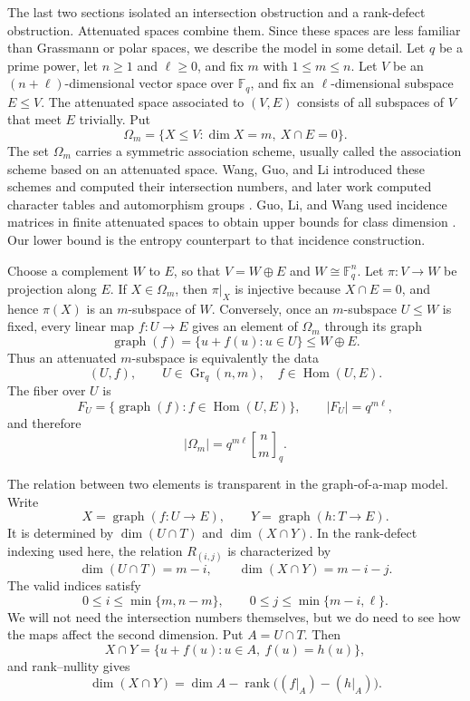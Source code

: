 \documentclass[11pt]{article}
\theoremstyle{definition}
\theoremstyle{remark}
\newcommand{\F}{\mathbb F}
\newcommand{\Gr}{\operatorname{Gr}}
\newcommand{\Hom}{\operatorname{Hom}}
\newcommand{\rank}{\operatorname{rank}}
\newcommand{\qbinom}[2]{\genfrac{[}{]}{0pt}{}{#1}{#2}_q}
\begin{document}
The last two sections isolated an intersection obstruction and a rank-defect
obstruction.  Attenuated spaces combine them.  Since these spaces are less
familiar than Grassmann or polar spaces, we describe the model in some detail.
Let \(q\) be a prime power, let
\(n\geq1\) and \(\ell\geq0\), and fix \(m\) with \(1\leq m\leq n\).
Let \(V\) be an \((n+\ell)\)-dimensional vector space over \(\F_q\), and
fix an \(\ell\)-dimensional subspace \(E\leq V\).  The attenuated space 
associated to \((V,E)\) consists of all subspaces of \(V\) that meet \(E\) 
trivially.  Put
\[
        \Omega_m=
        \{X\leq V:\dim X=m,\ X\cap E=0\}.
\]
The set \(\Omega_m\) carries a symmetric association scheme, usually 
called the association scheme based on an attenuated space.  Wang, Guo, 
and Li introduced these schemes and computed their intersection numbers, 
and later work computed character tables and automorphism groups 
\cite{WangGuoLiAttenuated,Kurihara,LiuWangAttenuated}.  Guo, Li, and Wang used 
incidence matrices in finite attenuated spaces to obtain upper bounds for 
class dimension \cite{GuoLiWang}.  Our lower bound is the entropy 
counterpart to that incidence construction.

Choose a complement \(W\) to \(E\), so that \(V=W\oplus E\) and 
\(W\cong\F_q^n\).  Let \(\pi:V\to W\) be projection along \(E\).  If 
\(X\in\Omega_m\), then \(\pi|_X\) is injective because \(X\cap E=0\), and 
hence \(\pi(X)\) is an \(m\)-subspace of \(W\).  Conversely, once an 
\(m\)-subspace \(U\leq W\) is fixed, every linear map \(f:U\to E\) gives 
an element of \(\Omega_m\) through its graph
\[
        \operatorname{graph}(f)=\{u+f(u):u\in U\}\leq W\oplus E.
\]
Thus an attenuated \(m\)-subspace is equivalently the data
\[
        (U,f),
        \qquad
        U\in\Gr_q(n,m),\quad f\in\Hom(U,E).
\]
The fiber over \(U\) is
\[
        F_U=\{\operatorname{graph}(f): f\in\Hom(U,E)\},
        \qquad |F_U|=q^{m\ell},
\]
and therefore
\[
        |\Omega_m|=q^{m\ell}\qbinom nm.
\]

The relation between two elements is transparent in the graph-of-a-map
model.  Write
\[
        X=\operatorname{graph}(f:U\to E),
        \qquad
        Y=\operatorname{graph}(h:T\to E).
\]
It is determined by \(\dim(U\cap T)\) and \(\dim(X\cap Y)\).  In the
rank-defect indexing used here, the relation \(R_{(i,j)}\) is characterized
by
\[
        \dim(U\cap T)=m-i,
        \qquad
        \dim(X\cap Y)=m-i-j.
\]
The valid indices satisfy
\[
        0\leq i\leq\min\{m,n-m\},
        \qquad
        0\leq j\leq\min\{m-i,\ell\}.
\]
We will not need the intersection numbers themselves, but we do need to 
see
how the maps affect the second dimension.  Put \(A=U\cap T\).  Then
\[
        X\cap Y
        =
        \{u+f(u):u\in A,\ f(u)=h(u)\},
\]
and rank--nullity gives
\[
        \dim(X\cap Y)
        =
        \dim A-\rank\bigl((f|_A)-(h|_A)\bigr).
\]
\end{document}
